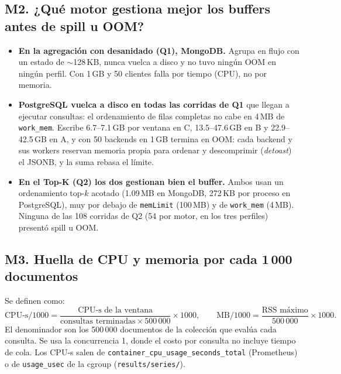 \documentclass[11pt,letterpaper]{article}
\begin{document}
\subsection*{M2. ¿Qué motor gestiona mejor los buffers antes de spill u OOM?}
\begin{itemize}
  \item \textbf{En la agregación con desanidado (Q1), MongoDB.} Agrupa en flujo con un estado de
        $\sim$128\,KB, nunca vuelca a disco y no tuvo ningún OOM en ningún perfil. Con 1\,GB y 50
        clientes falla por tiempo (CPU), no por memoria.
  \item \textbf{PostgreSQL vuelca a disco en todas las corridas de Q1} que llegan a ejecutar
        consultas: el ordenamiento de filas completas no cabe en 4\,MB de \texttt{work\_mem}.
        Escribe 6.7--7.1\,GB por ventana en C, 13.5--47.6\,GB en B y 22.9--42.5\,GB en A, y con
        50 backends en 1\,GB termina en OOM: cada backend y sus workers reservan memoria propia
        para ordenar y descomprimir (\emph{detoast}) el JSONB, y la suma rebasa el límite.
  \item \textbf{En el Top-K (Q2) los dos gestionan bien el buffer.} Ambos usan un ordenamiento
        top-$k$ acotado (1.09\,MB en MongoDB, 272\,KB por proceso en PostgreSQL), muy por debajo
        de \texttt{memLimit} (100\,MB) y de \texttt{work\_mem} (4\,MB). Ninguna de las 108
        corridas de Q2 (54 por motor, en los tres perfiles) presentó spill u OOM.
\end{itemize}

\subsection*{M3. Huella de CPU y memoria por cada 1\,000 documentos}
Se definen como:
\[
\text{CPU-s}/1000 = \frac{\text{CPU-s de la ventana}}{\text{consultas terminadas}\times 500\,000}\times 1000,
\qquad
\text{MB}/1000 = \frac{\text{RSS máximo}}{500\,000}\times 1000 .
\]
El denominador son los 500\,000 documentos de la colección que evalúa cada consulta. Se usa la
concurrencia 1, donde el costo por consulta no incluye tiempo de cola. Los CPU-s salen de
\texttt{container\_cpu\_usage\_seconds\_total} (Prometheus) o de \texttt{usage\_usec} de la
cgroup (\texttt{results/series/}).

\begin{table}[H]\centering\small
\caption{M3 con un cliente: CPU-s y MB de RSS por cada 1\,000 documentos (mediana de 3
repeticiones). $^\dagger$ Estimado: sin serie de CPU para esa celda, se usa la cuota del
perfil o el consumo de la misma celda en A, el menor de los dos.}
\label{tab:m3}

\end{table}
\end{document}
